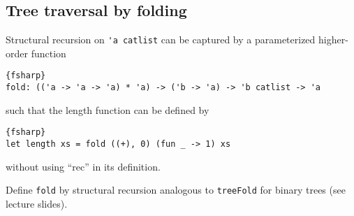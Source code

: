 \subsection*{Tree traversal by folding}

Structural recursion on \verb|'a catlist| can be captured by a parameterized higher-order function
\begin{lstlisting}{fsharp}
fold: (('a -> 'a -> 'a) * 'a) -> ('b -> 'a) -> 'b catlist -> 'a
\end{lstlisting}
such that the length function can be defined by
\begin{lstlisting}{fsharp}
let length xs = fold ((+), 0) (fun _ -> 1) xs
\end{lstlisting}
without using ``rec'' in its definition.

Define \verb|fold| by structural recursion analogous to \verb|treeFold| for binary trees (see lecture slides).
